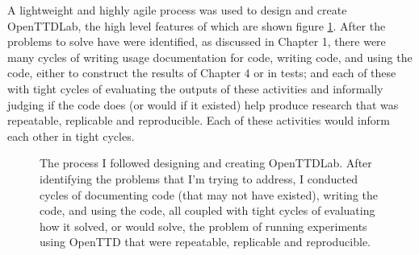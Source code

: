 \documentclass[logo,msc,dsti]{style/infthesis}    %
\begin{document}
{A lightweight and highly agile process was used to design and create OpenTTDLab, the high level features of which are shown figure \ref{fig:solo-agile}. After the problems to solve have were identified, as discussed in Chapter 1, there were many cycles of writing usage documentation for code, writing code, and using the code, either to construct the results of Chapter 4 or in tests; and each of these with tight cycles of evaluating the outputs of these activities and informally judging if the code does (or would if it existed) help produce research that was repeatable, replicable and reproducible. Each of these activities would inform each other in tight cycles.

\begin{figure}[ht]
\centering
{}
\caption{The process I followed designing and creating OpenTTDLab. After identifying the problems that I'm trying to address, I conducted cycles of documenting code (that may not have existed), writing the code, and using the code, all coupled with tight cycles of evaluating how it solved, or would solve, the problem of running experiments using OpenTTD that were repeatable, replicable and reproducible.}
\label{fig:solo-agile}
\end{figure}

}
\end{document}
